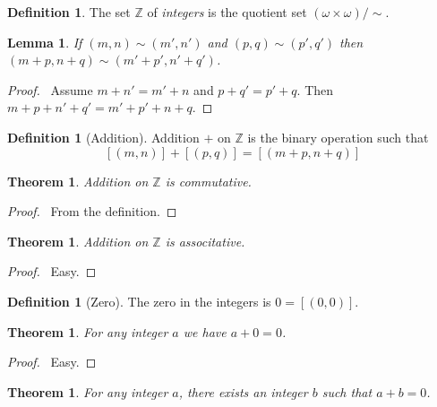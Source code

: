 \documentclass{article}
\let\qed\relax
\newtheorem{lemma}[axiom]{Lemma}
\newtheorem{theorem}[axiom]{Theorem}
\theoremstyle{definition}
\newtheorem{definition}[axiom]{Definition}
\begin{document}
    \begin{definition}
        The set $\mathbb{Z}$ of \emph{integers} is the quotient set $(\omega \times \omega) / \sim$.
    \end{definition}

    \begin{lemma}
        If $(m,n) \sim (m',n')$ and $(p,q) \sim (p',q')$ then $(m+p,n+q) \sim (m'+p',n'+q')$.
    \end{lemma}

    \begin{proof}
        \pf\ Assume $m + n' = m' + n$ and $p + q' = p' + q$. Then $m + p + n' + q' = m' + p' + n + q$. \qed
    \end{proof}

    \begin{definition}[Addition]
        Addition $+$ on $\mathbb{Z}$ is the binary operation such that
        \[ [(m,n)] + [(p,q)] = [(m+p,n+q)] \]
    \end{definition}

    \begin{theorem}
        Addition on $\mathbb{Z}$ is commutative.
    \end{theorem}

    \begin{proof}
        \pf\ From the definition. \qed
    \end{proof}

    \begin{theorem}
        Addition on $\mathbb{Z}$ is associtative.
    \end{theorem}

    \begin{proof}
        \pf\ Easy. \qed
    \end{proof}

    \begin{definition}[Zero]
        The zero in the integers is $0 = [(0,0)]$.
    \end{definition}

    \begin{theorem}
        For any integer $a$ we have $a + 0 = 0$.
    \end{theorem}

    \begin{proof}
        \pf\ Easy. \qed
    \end{proof}

    \begin{theorem}
        For any integer $a$, there exists an integer $b$ such that $a + b = 0$.
    \end{theorem}
\end{document}

